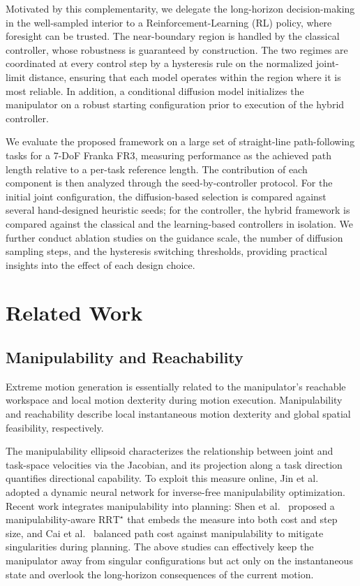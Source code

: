 \documentclass{svproc}
\begin{document}
Motivated by this complementarity, we delegate the long-horizon decision-making in the well-sampled interior to a Reinforcement-Learning (RL) policy, where foresight can be trusted. The near-boundary region is handled by the classical controller, whose robustness is guaranteed by construction. The two regimes are coordinated at every control step by a hysteresis rule on the normalized joint-limit distance, ensuring that each model operates within the region where it is most reliable. In addition, a conditional diffusion model initializes the manipulator on a robust starting configuration prior to execution of the hybrid controller.

We evaluate the proposed framework on a large set of straight-line path-following tasks for a 7-DoF Franka FR3, measuring performance as the achieved path length relative to a per-task reference length. The contribution of each component is then analyzed through the seed-by-controller protocol. For the initial joint configuration, the diffusion-based selection is compared against several hand-designed heuristic seeds; for the controller, the hybrid framework is compared against the classical and the learning-based controllers in isolation. We further conduct ablation studies on the guidance scale, the number of diffusion sampling steps, and the hysteresis switching thresholds, providing practical insights into the effect of each design choice.

\section{Related Work}

\subsection{Manipulability and Reachability}
Extreme motion generation is essentially related to the manipulator's reachable workspace and local motion dexterity during motion execution. Manipulability and reachability describe local instantaneous motion dexterity and global spatial feasibility, respectively.

The manipulability ellipsoid \cite{yoshikawa1985manipulability} characterizes the relationship between joint and task-space velocities via the Jacobian, and its projection along a task direction quantifies directional capability. To exploit this measure online, Jin et al.~\cite{jin2017manipulability} adopted a dynamic neural network for inverse-free manipulability optimization. Recent work integrates manipulability into planning: Shen et al.~\cite{shen2023adaptive} proposed a manipulability-aware $\text{RRT}^{\star}$ that embeds the measure into both cost and step size, and Cai et al.~\cite{cai2025just} balanced path cost against manipulability to mitigate singularities during planning. The above studies can effectively keep the manipulator away from singular configurations but act only on the instantaneous state and overlook the long-horizon consequences of the current motion.
\end{document}

